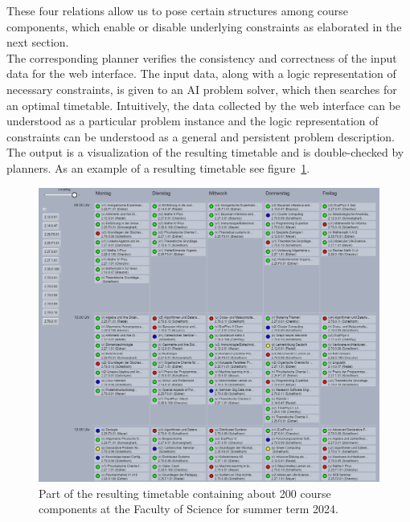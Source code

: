 \documentclass{easychair}
\begin{document}
  These four relations allow us to pose certain structures among course components, which enable or disable underlying constraints as elaborated in the next section. \\ 
  The corresponding planner verifies the consistency and correctness of the input data for the web interface. 
  The input data, along with a logic representation of necessary constraints, is given to an AI problem solver, which then searches for an optimal timetable. 
  Intuitively, the data collected by the web interface can be understood as a particular problem instance and the logic representation of constraints can be understood as a general and persistent problem description. 
  The output is a visualization of the resulting timetable and is double-checked by planners. 
  As an example of a resulting timetable see figure~\ref{fig:timetable}. 
  \begin{figure}
    \includegraphics[width=\linewidth]{timetable}
    \caption{Part of the resulting timetable containing about 200 course components at the Faculty of Science for summer term 2024.}
    \label{fig:timetable}
  \end{figure} \\
\end{document}
